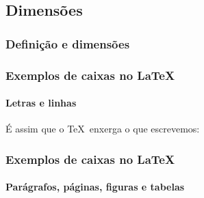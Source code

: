 \documentclass[handout,10pt]{beamer}
\newcommand{\scalefactor}{7}
\begin{document}
\subsection{Dimensões}
\begin{frame}
	\frametitle{Definição e dimensões}

	\centering
	
	
		
	\vfill
				
	\ifhandout\else%
	\fi
								
\end{frame}
\newsavebox{\demoboxes}
\begin{frame}[c]
	\frametitle{Exemplos de caixas no \LaTeX}
	\framesubtitle{Letras e linhas}
	
	\begin{center}
		
				
		
		{\large É assim que o \TeX\ enxerga o que escrevemos:}\\
		\usebox{\demoboxes}
		
		\vspace{3em}
		
	\end{center}
\end{frame}
\renewcommand{\scalefactor}{3}
\begin{frame}[c]
	\frametitle{Exemplos de caixas no \LaTeX}
	\framesubtitle{Parágrafos, páginas, figuras e tabelas}
	
	\begin{center}
	
		\begin{columns}
			\centering
		
				\centering
			
				
			
				\centering
			
				
		\end{columns}
	\end{center}
	
\end{frame}
\end{document}
